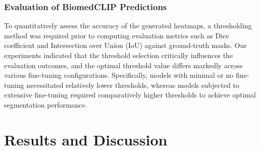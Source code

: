 \documentclass[./dissertation.tex]{subfiles}
\begin{document}
\subsubsection{Evaluation of BiomedCLIP Predictions}

To quantitatively assess the accuracy of the generated heatmaps, a thresholding method was required prior to computing evaluation metrics such as Dice coefficient and Intersection over Union (IoU) against ground-truth masks. Our experiments indicated that the threshold selection critically influences the evaluation outcomes, and the optimal threshold value differs markedly across various fine-tuning configurations. Specifically, models with minimal or no fine-tuning necessitated relatively lower thresholds, whereas models subjected to extensive fine-tuning required comparatively higher thresholds to achieve optimal segmentation performance.


\section{Results and Discussion}






\end{document}
